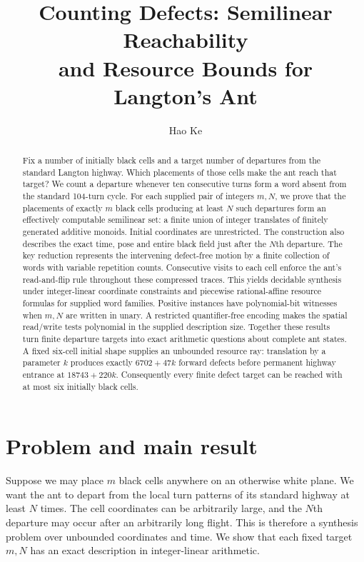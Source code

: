 \documentclass[11pt]{article}
\title{Counting Defects: Semilinear Reachability\\and Resource Bounds for Langton's Ant}
\author{Hao Ke}
\date{}
\theoremstyle{remark}\newtheorem{remark}[theorem]{Remark}
\begin{document}
\maketitle
\begin{abstract}
Fix a number of initially black cells and a target number of departures
from the standard Langton highway. Which placements of those cells make the
ant reach that target? We count a departure whenever ten consecutive turns
form a word absent from the standard 104-turn cycle. For each supplied pair
of integers $m,N$, we prove that the placements of exactly $m$ black cells
producing at least $N$ such departures form an effectively computable
semilinear set: a finite union of integer translates of finitely generated
additive monoids. Initial coordinates are unrestricted. The construction also
describes the exact time, pose and entire black field just after the $N$th
departure. The key reduction represents the intervening defect-free motion by a
finite collection of words with variable repetition counts. Consecutive visits
to each cell enforce the ant's read-and-flip rule throughout these compressed
traces. This yields decidable synthesis under integer-linear coordinate
constraints and piecewise rational-affine resource formulas for supplied
word families. Positive instances have polynomial-bit witnesses when $m,N$
are written in unary. A restricted quantifier-free encoding makes the
spatial read/write tests polynomial in the supplied description size.
Together these results turn finite departure targets into exact arithmetic
questions about complete ant states.
A fixed six-cell initial shape supplies an unbounded resource ray:
translation by a parameter $k$ produces exactly $6702+47k$ forward defects
before permanent highway entrance at $18743+220k$. Consequently every finite
defect target can be reached with at most six initially black cells.
\end{abstract}

\section{Problem and main result}
Suppose we may place $m$ black cells anywhere on an otherwise white plane.
We want the ant to depart from the local turn patterns of its standard highway
at least $N$ times. The cell coordinates can be arbitrarily large, and the
$N$th departure may occur after an arbitrarily long flight. This is therefore
a synthesis problem over unbounded coordinates and time. We show that each
fixed target $m,N$ has an exact description in integer-linear arithmetic.
\end{document}
